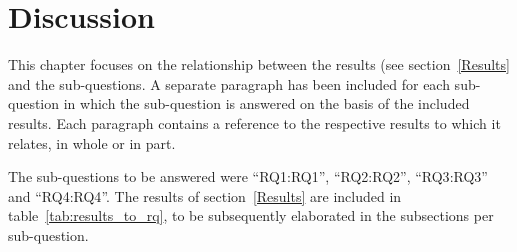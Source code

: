 \newpage
{}
\section{Discussion} \label{section:discussion}

\begin{comment}
the discussion, in which you connect the results to the research questions and the literature

aanpak log verwerking:
- totaliseren van de results
- actie research: wat ben ik aan het doen
- experimenteren in de praktijk
- deel uitmaken van het proces
- laten gebeuren
- valt me op dat .... -> content analyse
- cluster waarneming -> beschouwen: het valt me op dat .. en onderbouwing
- bottom up (logs) en top down (gesprekken)
- bij elk log -> wie wat waar; traceerbaar houden
=======
- iemand moet het nalezen op consistentie
- nalezen op vorm
- checken of de referenties nog kloppen

\end{comment}
This chapter focuses on the relationship between the results (see section~\ref{Results} and the sub-questions.
A separate paragraph has been included for each sub-question in which the sub-question is answered on the basis of the included results.
Each paragraph contains a reference to the respective results to which it relates, in whole or in part.

The sub-questions to be answered were ``\acrshort{RQ1}:\acrlong{RQ1}'', ``\acrshort{RQ2}:\acrlong{RQ2}'', ``\acrshort{RQ3}:\acrlong{RQ3}'' and ``\acrshort{RQ4}:\acrlong{RQ4}''.
The results of section~\ref{Results} are included in table~\ref{tab:results_to_rq}, to be subsequently elaborated in the subsections per sub-question.

